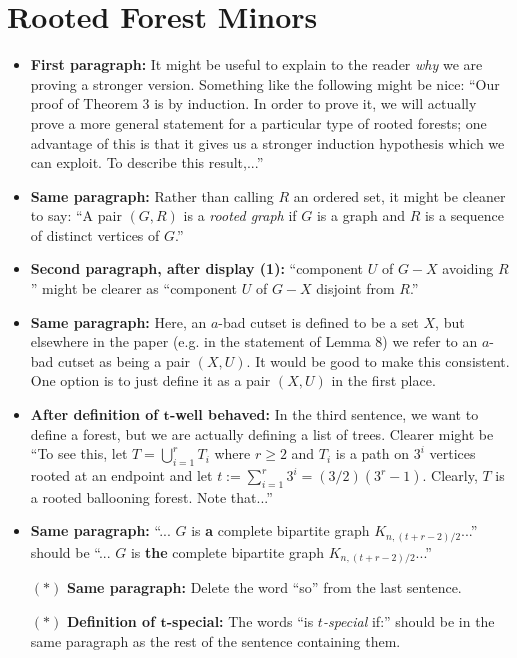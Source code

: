 \documentclass[11 pt]{article}
\theoremstyle{definition}
\theoremstyle{case}
\numberwithin{equation}{section}
\begin{document}
\section{Rooted Forest Minors}

\begin{itemize}
\item \textbf{First paragraph:} It might be useful to explain to the reader \emph{why} we are proving a stronger version. Something like the following might be nice: ``Our proof of Theorem 3 is by induction. In order to prove it, we will actually prove a more general statement for a particular type of rooted forests; one advantage of this is that it gives us a stronger induction hypothesis which we can exploit. To describe this result,...''
\item \textbf{Same paragraph:} Rather than calling $R$ an ordered set, it might be cleaner to say: ``A pair $(G,R)$ is a \emph{rooted graph} if $G$ is a graph and $R$ is a sequence of distinct vertices of $G$.''
\item \textbf{Second paragraph, after display (1):} ``component $U$ of $G-X$ avoiding $R$'' might be clearer as ``component $U$ of $G-X$ disjoint from $R$.''
\item \textbf{Same paragraph:} Here, an $a$-bad cutset is defined to be a set $X$, but elsewhere in the paper (e.g. in the statement of Lemma 8) we refer to an $a$-bad cutset as being a pair $(X,U)$. It would be good to make this consistent. One option is to just define it as a pair $(X,U)$ in the first place. 
\item \textbf{After definition of $\boldsymbol{t}$-well behaved:} In the third sentence, we want to define a forest, but we are actually defining a list of trees. Clearer might be ``To see this, let $T=\bigcup_{i=1}^rT_i$ where $r\geq2$ and $T_i$ is a path on $3^i$ vertices rooted at an endpoint and let $t:=\sum_{i=1}^r 3^i = (3/2)(3^r-1)$. Clearly, $T$ is a rooted ballooning forest. Note that...''
\item \textbf{Same paragraph:} ``... $G$ is \textbf{a} complete bipartite graph $K_{n,(t+r-2)/2}$...'' should be ``... $G$ is \textbf{the} complete bipartite graph $K_{n,(t+r-2)/2}$...''
\item[$\boldsymbol{(*)}$] \textbf{Same paragraph:} Delete the word ``so'' from the last sentence.
\item[$\boldsymbol{(*)}$] \textbf{Definition of $\boldsymbol{t}$-special:} The words ``is \emph{$t$-special} if:'' should be in the same paragraph as the rest of the sentence containing them.

\end{itemize}
\end{document}
